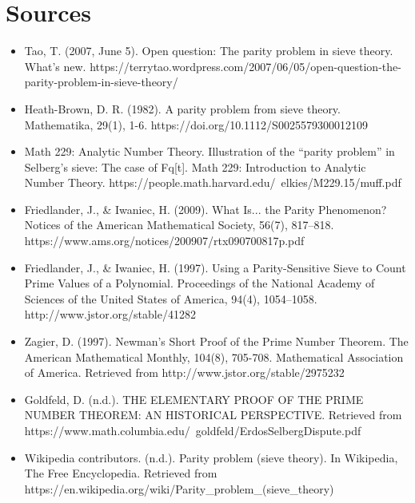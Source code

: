 \section{Sources}
\begin{itemize}
  \item Tao, T. (2007, June 5). Open question: The parity problem in sieve theory. What's new. https://terrytao.wordpress.com/2007/06/05/open-question-the-parity-problem-in-sieve-theory/
  \item Heath-Brown, D. R. (1982). A parity problem from sieve theory. Mathematika, 29(1), 1-6. https://doi.org/10.1112/S0025579300012109
  \item Math 229: Analytic Number Theory. Illustration of the “parity problem” in Selberg’s sieve: The case of Fq[t]. Math 229: Introduction to Analytic Number Theory. https://people.math.harvard.edu/~elkies/M229.15/muff.pdf
  \item Friedlander, J., \& Iwaniec, H. (2009). What Is... the Parity Phenomenon? Notices of the American Mathematical Society, 56(7), 817–818. https://www.ams.org/notices/200907/rtx090700817p.pdf
  \item Friedlander, J., \& Iwaniec, H. (1997). Using a Parity-Sensitive Sieve to Count Prime Values of a Polynomial. Proceedings of the National Academy of Sciences of the United States of America, 94(4), 1054–1058. http://www.jstor.org/stable/41282
  \item Zagier, D. (1997). Newman's Short Proof of the Prime Number Theorem. The American Mathematical Monthly, 104(8), 705-708. Mathematical Association of America. Retrieved from http://www.jstor.org/stable/2975232
  \item Goldfeld, D. (n.d.). THE ELEMENTARY PROOF OF THE PRIME NUMBER THEOREM: AN HISTORICAL PERSPECTIVE. Retrieved from https://www.math.columbia.edu/~goldfeld/ErdosSelbergDispute.pdf
  \item Wikipedia contributors. (n.d.). Parity problem (sieve theory). In Wikipedia, The Free Encyclopedia. Retrieved from https://en.wikipedia.org/wiki/Parity_problem_(sieve_theory)
\end{itemize}

